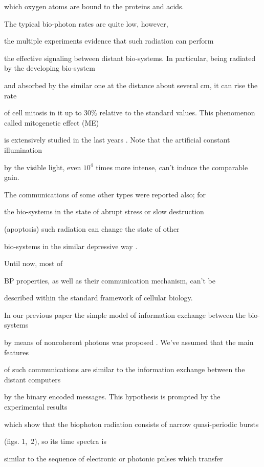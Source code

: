 which oxygen atoms are bound to the proteins and acids.



         The typical bio-photon rates are quite low, however,

the multiple experiments evidence that such radiation can perform

the effective signaling between distant bio-systems.  In particular, being radiated by the developing bio-system

 and absorbed by the similar one at the distance about several cm, it can rise the rate

 of cell mitosis in it up to $30\%$ relative to the standard values. This phenomenon called mitogenetic effect (ME)

   is extensively studied in the last years  \cite {mayb:2, mayb:3}. Note that the  artificial constant illumination

    by the  visible light, even $10^4$ times more intense, can't induce the comparable gain.

The communications of some other types were reported also; for

the bio-systems in the state of abrupt stress or slow destruction

(apoptosis)  such radiation can change the state of other

bio-systems in the similar depressive way \cite {mayb:2, mayb:D4}.



Until now,  most of

BP properties, as well as their communication mechanism, can't be

described  within the standard framework of cellular biology.

 In our previous paper the simple model of information exchange between the bio-systems

 by means of noncoherent photons was proposed  \cite{mayb:C4}. We've assumed that the main features

  of  such  communications are similar to the  information exchange between the distant computers

   by the binary encoded messages. This hypothesis is prompted by the  experimental results

    which show that the biophoton radiation consists of  narrow quasi-periodic bursts

      (figs. 1,~2), so its time spectra is

  similar to the sequence of  electronic or photonic  pulses which transfer

